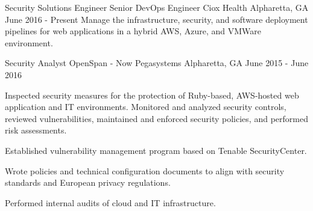 


\begin{cventries}


\cventry
{Security Solutions Engineer\newline
Senior DevOps Engineer}
{Ciox Health}
{Alpharetta, GA}
{June 2016 - Present}
{ %
Manage the infrastructure, security, and software deployment pipelines for web applications in a hybrid AWS, Azure, and VMWare environment.
}


\cventry
{Security Analyst}
{OpenSpan - Now Pegasystems}
{Alpharetta, GA}
{June 2015 - June 2016}
{ %
Inspected security measures for the protection of Ruby-based, AWS-hosted web application and IT environments. Monitored and analyzed security controls, reviewed vulnerabilities, maintained and enforced security policies, and performed risk assessments.
\begin{cvitems}
\item[]
\item {Established vulnerability management program based on Tenable SecurityCenter.}
\item {Wrote policies and technical configuration documents to align with security standards and European privacy regulations.}
\item {Performed internal audits of cloud and IT infrastructure.}
\end{cvitems}
}



\end{cventries}
